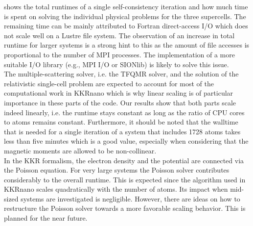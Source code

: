 \documentclass [a4paper, 12pt]{article}
\begin{document}
shows the total runtimes of a single self-consistency iteration and how much time is spent
on solving the individual physical problems for the three supercells.
The remaining time
can be mainly attributed to Fortran direct-access I/O which does not scale well on a Lustre file system.
The observation of an increase in total runtime for larger systems is a strong hint to this as the amount of
file accesses is proportional to the number of MPI processes.
The implementation of a more suitable I/O library (e.g., MPI I/O or SIONlib) is likely to solve this issue.
\\
The multiple-scattering solver, i.e. the TFQMR solver, 
and the solution of the relativistic single-cell problem are
expected to account for most of the computational work in KKRnano which 
is why linear scaling is of particular importance in these parts of the code.
Our results show that both parts scale indeed linearly, i.e. the runtime stays constant as long as
the ratio of CPU cores to atoms remains constant.
Furthermore, it should be noted that the walltime that is needed for a single iteration of a system
that includes 1728 atoms
takes less than five minutes which is a good value, especially when considering that
the magnetic moments are allowed to be non-collinear.
\\
In the KKR formalism, the electron density and the potential are connected via the Poisson equation. 
For very large systems the Poisson solver contributes considerably to the overall runtime.
This is expected since the algorithm used in KKRnano scales
quadratically with the number of atoms. Its impact when mid-sized systems are investigated is negligible. 
However, there are ideas on how to restructure the Poisson solver towards a more favorable scaling behavior.
This is planned for the near future.\\
\end{document}
